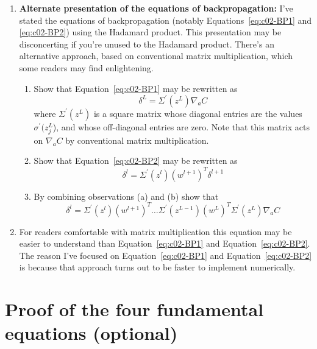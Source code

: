 \begin{enumerate}
\item 
\textbf{Alternate presentation of the equations of backpropagation: }
I've stated the equations of backpropagation (notably Equations~\ref{eq:c02-BP1} and \ref{eq:c02-BP2}) using the Hadamard product. This presentation may be disconcerting if you're unused to the Hadamard product. There's an alternative approach, based on conventional matrix multiplication, which some readers may find enlightening. 
\begin{enumerate}
\item 
Show that Equation~\ref{eq:c02-BP1} may be rewritten as 
\begin{equation}
\delta^{L}=\Sigma^{\prime}\left(z^{L}\right) \nabla_{a} C
\label{eq:c02-33}
\end{equation}
where $\Sigma^{\prime}\left(z^{L}\right)$ is a square matrix whose diagonal entries are the values $\sigma^\prime(z^L_j$), and whose off-diagonal entries are zero. Note that this matrix acts on $\nabla_{a} C$ by conventional matrix multiplication. 

\item 
Show that Equation~\ref{eq:c02-BP2} may be rewritten as 
\begin{equation}
\delta^{l}=\Sigma^{\prime}\left(z^{l}\right)\left(w^{l+1}\right)^{T} \delta^{l+1}
\label{eq:c02-34}
\end{equation}
\item 
By combining observations (a) and (b) show that 
\begin{equation}
\delta^{l}=\Sigma^{\prime}\left(z^{l}\right)\left(w^{l+1}\right)^{T} \ldots \Sigma^{\prime}\left(z^{L-1}\right)\left(w^{L}\right)^{T} \Sigma^{\prime}\left(z^{L}\right) \nabla_{a} C
\label{eq:c02-35}
\end{equation}
\end{enumerate}

\item 
For readers comfortable with matrix multiplication this equation may be easier to understand than Equation~\ref{eq:c02-BP1} and Equation~\ref{eq:c02-BP2}. The reason I've focused on Equation~\ref{eq:c02-BP1} and Equation~\ref{eq:c02-BP2} is because that approach turns out to be faster to implement numerically. 
\end{enumerate}



\section{Proof of the four fundamental equations (optional)}
\label{sec:Proofofthefourfundamentalequations(optional)}

